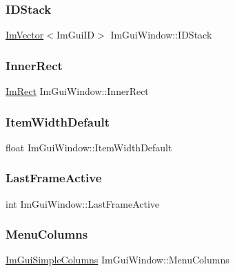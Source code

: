 \subsubsection{\texorpdfstring{I\+D\+Stack}{IDStack}}
{\footnotesize\ttfamily \hyperlink{class_im_vector}{Im\+Vector}$<$Im\+Gui\+ID$>$ Im\+Gui\+Window\+::\+I\+D\+Stack}

\hypertarget{struct_im_gui_window_a0fd27908ebffb5d9509dc9e7f199d67d}{}\label{struct_im_gui_window_a0fd27908ebffb5d9509dc9e7f199d67d} 
\subsubsection{\texorpdfstring{Inner\+Rect}{InnerRect}}
{\footnotesize\ttfamily \hyperlink{struct_im_rect}{Im\+Rect} Im\+Gui\+Window\+::\+Inner\+Rect}

\hypertarget{struct_im_gui_window_a5e6be361ee0c71a22a1ff68f6dbf09ff}{}\label{struct_im_gui_window_a5e6be361ee0c71a22a1ff68f6dbf09ff} 
\subsubsection{\texorpdfstring{Item\+Width\+Default}{ItemWidthDefault}}
{\footnotesize\ttfamily float Im\+Gui\+Window\+::\+Item\+Width\+Default}

\hypertarget{struct_im_gui_window_a6f3c194efabb4fd0a99be45fa5fe26f1}{}\label{struct_im_gui_window_a6f3c194efabb4fd0a99be45fa5fe26f1} 
\subsubsection{\texorpdfstring{Last\+Frame\+Active}{LastFrameActive}}
{\footnotesize\ttfamily int Im\+Gui\+Window\+::\+Last\+Frame\+Active}

\hypertarget{struct_im_gui_window_a9207bb87da58863ce60c08679ef19977}{}\label{struct_im_gui_window_a9207bb87da58863ce60c08679ef19977} 
\subsubsection{\texorpdfstring{Menu\+Columns}{MenuColumns}}
{\footnotesize\ttfamily \hyperlink{struct_im_gui_simple_columns}{Im\+Gui\+Simple\+Columns} Im\+Gui\+Window\+::\+Menu\+Columns}

